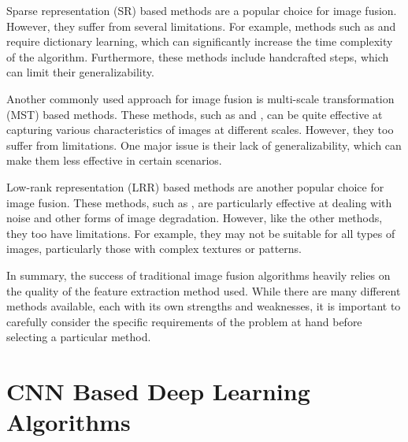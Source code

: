 Sparse representation (SR)\cite{liu2017infrared}  based methods are a popular choice for image fusion. However, they suffer from several limitations. For example, methods such as \cite{bin2016efficient} and \cite{zhang2013dictionary} require dictionary learning, which can significantly increase the time complexity of the algorithm. Furthermore, these methods include handcrafted steps, which can limit their generalizability.

Another commonly used approach for image fusion is multi-scale transformation (MST) based methods. These methods, such as \cite{hu2017adaptive} and \cite{he2017infrared}, can be quite effective at capturing various characteristics of images at different scales. However, they too suffer from limitations. One major issue is their lack of generalizability, which can make them less effective in certain scenarios.

Low-rank representation (LRR) based methods are another popular choice for image fusion. These methods, such as \cite{liu2012robust}, are particularly effective at dealing with noise and other forms of image degradation. However, like the other methods, they too have limitations. For example, they may not be suitable for all types of images, particularly those with complex textures or patterns.

In summary, the success of traditional image fusion algorithms heavily relies on the quality of the feature extraction method used. While there are many different methods available, each with its own strengths and weaknesses, it is important to carefully consider the specific requirements of the problem at hand before selecting a particular method.

\section{CNN Based Deep Learning Algorithms}
\label{sec:CNN}

